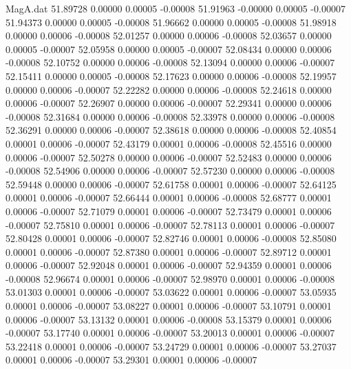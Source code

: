 \begin{filecontents}{MagA.dat}
  51.89728    0.00000    0.00005   -0.00008
  51.91963   -0.00000    0.00005   -0.00007
  51.94373    0.00000    0.00005   -0.00008
  51.96662    0.00000    0.00005   -0.00008
  51.98918    0.00000    0.00006   -0.00008
  52.01257    0.00000    0.00006   -0.00008
  52.03657    0.00000    0.00005   -0.00007
  52.05958    0.00000    0.00005   -0.00007
  52.08434    0.00000    0.00006   -0.00008
  52.10752    0.00000    0.00006   -0.00008
  52.13094    0.00000    0.00006   -0.00007
  52.15411    0.00000    0.00005   -0.00008
  52.17623    0.00000    0.00006   -0.00008
  52.19957    0.00000    0.00006   -0.00007
  52.22282    0.00000    0.00006   -0.00008
  52.24618    0.00000    0.00006   -0.00007
  52.26907    0.00000    0.00006   -0.00007
  52.29341    0.00000    0.00006   -0.00008
  52.31684    0.00000    0.00006   -0.00008
  52.33978    0.00000    0.00006   -0.00008
  52.36291    0.00000    0.00006   -0.00007
  52.38618    0.00000    0.00006   -0.00008
  52.40854    0.00001    0.00006   -0.00007
  52.43179    0.00001    0.00006   -0.00008
  52.45516    0.00000    0.00006   -0.00007
  52.50278    0.00000    0.00006   -0.00007
  52.52483    0.00000    0.00006   -0.00008
  52.54906    0.00000    0.00006   -0.00007
  52.57230    0.00000    0.00006   -0.00008
  52.59448    0.00000    0.00006   -0.00007
  52.61758    0.00001    0.00006   -0.00007
  52.64125    0.00001    0.00006   -0.00007
  52.66444    0.00001    0.00006   -0.00008
  52.68777    0.00001    0.00006   -0.00007
  52.71079    0.00001    0.00006   -0.00007
  52.73479    0.00001    0.00006   -0.00007
  52.75810    0.00001    0.00006   -0.00007
  52.78113    0.00001    0.00006   -0.00007
  52.80428    0.00001    0.00006   -0.00007
  52.82746    0.00001    0.00006   -0.00008
  52.85080    0.00001    0.00006   -0.00007
  52.87380    0.00001    0.00006   -0.00007
  52.89712    0.00001    0.00006   -0.00007
  52.92048    0.00001    0.00006   -0.00007
  52.94359    0.00001    0.00006   -0.00008
  52.96674    0.00001    0.00006   -0.00007
  52.98970    0.00001    0.00006   -0.00008
  53.01303    0.00001    0.00006   -0.00007
  53.03622    0.00001    0.00006   -0.00007
  53.05935    0.00001    0.00006   -0.00007
  53.08227    0.00001    0.00006   -0.00007
  53.10791    0.00001    0.00006   -0.00007
  53.13132    0.00001    0.00006   -0.00008
  53.15379    0.00001    0.00006   -0.00007
  53.17740    0.00001    0.00006   -0.00007
  53.20013    0.00001    0.00006   -0.00007
  53.22418    0.00001    0.00006   -0.00007
  53.24729    0.00001    0.00006   -0.00007
  53.27037    0.00001    0.00006   -0.00007
  53.29301    0.00001    0.00006   -0.00007

\end{filecontents}
